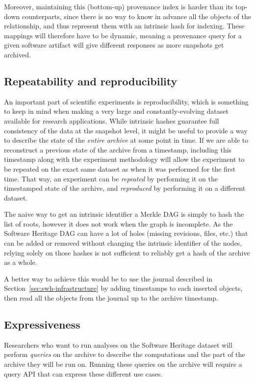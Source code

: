Moreover, maintaining this (bottom-up) provenance index is harder than its
top-down counterparts, since there is no way to know in advance all the objects
of the relationship, and thus represent them with an intrinsic hash for
indexing. These mappings will therefore have to be dynamic, meaning a
provenance query for a given software artifact will give different responses
as more snapshots get archived.

\subsection{Repeatability and reproducibility}

An important part of scientific experiments is reproducibility, which is
something to keep in mind when making a very large and
constantly-evolving dataset available for research applications. While
intrinsic hashes guarantee full consistency of the data at the snapshot level,
it might be useful to provide a way to describe the state of the \emph{entire
  archive} at some point in time. If we are able to reconstruct a previous
state of the archive from a timestamp, including this timestamp along
with the experiment methodology will allow the experiment to be repeated on the
exact same dataset as when it was performed for the first time. That way, an
experiment can be \emph{repeated} by performing it on the timestamped state of
the archive, and \emph{reproduced} by performing it on a different dataset.

The naive way to get an intrinsic identifier a Merkle DAG is simply to hash the
list of roots, however it does not work when the graph is incomplete. As the
Software Heritage DAG can have a lot of holes (missing revisions, files, etc.)
that can be added or removed without changing the intrinsic identifier of the
nodes, relying solely on those hashes is not sufficient to reliably get a
hash of the archive as a whole.

A better way to achieve this would be to use the journal described in
Section~\ref{sec:swh-infrastructure} by adding timestamps to each inserted
objects, then read all the objects from the journal up to the archive timestamp.

\subsection{Expressiveness}

Researchers who want to run analyses on the Software Heritage dataset will
perform \emph{queries} on the archive to describe the computations and the part
of the archive they will be run on. Running these queries on the archive will
require a query API that can express these different use cases.

